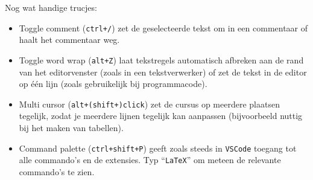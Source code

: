 \documentclass[kulak]{kulakarticle} %
\begin{document}
Nog wat handige trucjes:
\begin{itemize}
	\item Toggle comment (\texttt{ctrl+/}) zet de geselecteerde tekst om in een commentaar of haalt het commentaar weg.
	\item Toggle word wrap (\texttt{alt+Z}) laat tekstregels automatisch afbreken aan de rand van het editorvenster (zoals in een tekstverwerker) of zet de tekst in de editor op één lijn (zoals gebruikelijk bij programmacode).
	\item Multi cursor (\texttt{alt+(shift+)click}) zet de cursus op meerdere plaatsen tegelijk, zodat je meerdere lijnen tegelijk kan aanpassen (bijvoorbeeld nuttig bij het maken van tabellen).
	\item Command palette (\texttt{ctrl+shift+P}) geeft zoals steeds in \texttt{VSCode} toegang tot alle commando's en de extensies. Typ ``\texttt{LaTeX}'' om meteen de relevante commando's te zien.
\end{itemize}
\end{document}
